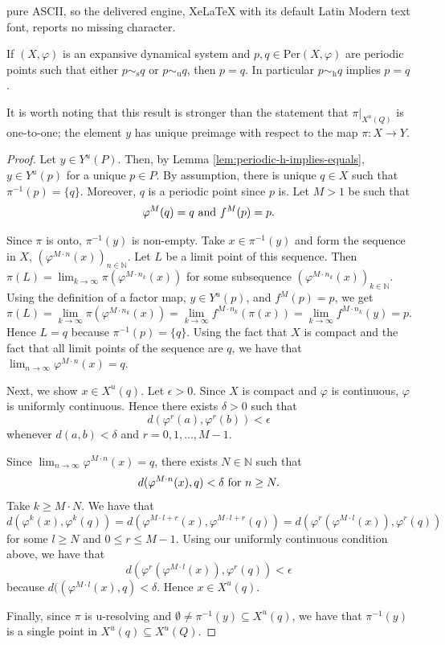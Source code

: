 \documentclass[10pt,a4paper]{amsart}
\newcommand{\N}{\mathbb{N}}
\newcommand{\Per}{\text{Per}}
\begin{document}
pure ASCII, so the delivered engine, XeLaTeX with its default Latin Modern text font, reports no missing character.
\begin{lemma}\label{lem:periodic-h-implies-equals}
If $(X,\varphi)$ is an expansive dynamical system and $p , q \in \Per(X,\varphi)$ are periodic points such that either $p \sim_\text{s} q$ or $p \sim_\text{u} q$, then $p = q$.  In particular $p \sim_\text{h} q$ implies $p = q$.
\end{lemma}

\begin{remark}
It is worth noting that this result is stronger than the statement that $\pi|_{X^u(Q)}$ is one-to-one; the element $y$ has unique preimage with respect to the map $\pi : X \rightarrow Y$.
\end{remark}

\begin{proof}
Let $y\in Y^u(P)$. Then, by Lemma \ref{lem:periodic-h-implies-equals},  $y \in Y^u(p)$ for a unique $p\in P$. By assumption, there is unique $q\in X$ such that $\pi^{-1}(p)=\{ q \}$. Moreover, $q$ is a periodic point since $p$ is. Let $M>1$ be such that 
\[
\varphi^M(q)=q \hbox{ and }f^M(p)=p.
\]

Since $\pi$ is onto, $\pi^{-1}(y)$ is non-empty. Take $x\in \pi^{-1}(y)$ and form the sequence in $X$, $(\varphi^{M\cdot n}(x))_{n\in \N}$. Let $L$ be a limit point of this sequence. Then $\pi(L)=\lim_{k\rightarrow \infty} \pi( \varphi^{M\cdot n_k}(x))$ for some subsequence $(\varphi^{M\cdot n_k}(x))_{k\in \N}$. Using the definition of a factor map, $y\in Y^u(p)$, and $f^M(p)=p$, we get
\[
\pi(L)=\lim_{k\rightarrow \infty} \pi( \varphi^{M\cdot n_k}(x))=\lim_{k\rightarrow \infty} f^{M\cdot n_k}(\pi(x))=\lim_{k\rightarrow \infty}f^{M\cdot n_k}(y)=p.
\]
Hence $L=q$ because $\pi^{-1}(p)=\{q\}$. Using the fact that $X$ is compact and the fact that all limit points of the sequence are $q$, we have that $\lim_{n \rightarrow \infty} \varphi^{M\cdot n}(x)=q$. 

Next, we show $x \in X^u(q)$. Let $\epsilon>0$. Since $X$ is compact and $\varphi$ is continuous, $\varphi$ is uniformly continuous. Hence there exists $\delta>0$ such that 
\[
d(\varphi^r(a), \varphi^r(b))<\epsilon
\]
whenever $d(a, b)<\delta$ and $r=0, 1, \ldots, M-1$.

Since $\lim_{n \rightarrow \infty} \varphi^{M\cdot n}(x)=q$, there exists $N\in \N$ such that 
\[
d(\varphi^{M\cdot n}(x), q) < \delta \hbox{ for }n\ge N.
\]
Take $k \geq M \cdot N$. We have that
\[
d(\varphi^k(x), \varphi^k(q))=d(\varphi^{M\cdot l + r}(x), \varphi^{M\cdot l + r}(q))=d(\varphi^r(\varphi^{M\cdot l}(x)), \varphi^r(q))
\]
for some $l\ge N$ and $0\le r \le M-1$. Using our uniformly continuous condition above, we have that 
\[ d(\varphi^r(\varphi^{M\cdot l}(x)), \varphi^r(q))< \epsilon \]
because $d((\varphi^{M\cdot l}(x), q)< \delta$. Hence $x\in X^u(q)$.

Finally, since $\pi$ is u-resolving and $\emptyset \neq \pi^{-1}(y) \subseteq X^u(q)$, we have that $\pi^{-1}(y)$ is a single point in $X^u(q) \subseteq X^u(Q)$.
\end{proof}
\end{document}
